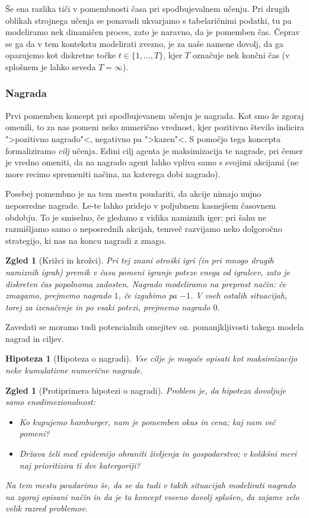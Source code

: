 \documentclass[12pt,a4paper]{amsart}
\theoremstyle{definition} %
\theoremstyle{plain} %
\newtheorem{zgled}[definicija]{Zgled}
\newtheorem{hipoteza}[definicija]{Hipoteza}
\begin{document}
Še ena razlika tiči v pomembnosti časa pri spodbujevalnem učenju. Pri drugih oblikah 
strojnega učenja se ponavadi ukvarjamo s tabelaričnimi podatki, tu pa modeliramo nek 
dinamičen proces, zato je naravno, da je pomemben čas. Čeprav se ga da v tem kontekstu 
modelirati zvezno, je za naše namene dovolj, da ga opazujemo kot diskretne točke $t \in 
\{1, \dots, T\} $, kjer $T$ označuje nek končni čas (v splošnem je lahko seveda $T = \infty$).

\subsubsection{Nagrada}
Prvi pomemben koncept pri spodbujevanem učenju je nagrada. Kot smo že zgoraj omenili, to za nas 
pomeni neko numerično vrednost, kjer pozitivno število indicira ">pozitivno nagrado"<, negativno pa 
">kazen"<. S pomočjo tega koncepta formaliziramo \textit{cilj} učenja. Edini cilj agenta je 
maksimizacija te nagrade, pri čemer je vredno omeniti, da na nagrado agent lahko vpliva samo 
s svojimi akcijami (ne more recimo spremeniti načina, na katerega dobi nagrado). 

Posebej pomembno je na tem mestu poudariti, da akcije nimajo nujno neposredne nagrade. Le-te 
lahko pridejo v poljubnem kasnejšem časovnem obdobju. To je smiselno, če gledamo z vidika 
namiznih iger: pri šahu ne razmišljamo samo o neposrednih akcijah, temveč razvijamo neko 
dolgoročno strategijo, ki nas na koncu nagradi z zmago. 

\begin{zgled}[Križci in krožci]
    Pri tej znani otroški igri (in pri mnogo drugih namiznih igrah) premik v času pomeni 
    igranje poteze enega od igralcev, zato je diskreten čas popolnoma zadosten. Nagrado 
    modeliramo na preprost način: če zmagamo, prejmemo nagrado $1$, če izgubimo pa $-1$. 
    V vseh ostalih situacijah, torej za izenačenje in po vsaki potezi, prejmemo nagrado $0$.
\end{zgled}

Zavedati se moramo tudi potencialnih omejitev oz. pomanjkljivosti takega modela nagrad in ciljev. 
\begin{hipoteza}[Hipoteza o nagradi]
    Vse cilje je mogoče opisati kot maksimizacijo neke kumulativne numerične 
    nagrade.
\end{hipoteza}

\begin{zgled}[Protiprimera hipotezi o nagradi]
    Problem je, da hipoteza dovoljuje samo enodimezionalnost:
    \begin{itemize}
        \item Ko kupujemo hamburger, nam je pomemben okus in cena; kaj nam več pomeni?
        \item Država želi med epidemijo ohraniti življenja in gospodarstvo; v kolikšni 
                meri naj prioritizira ti dve katergoriji?
    \end{itemize}
    Na tem mestu poudarimo še, da se da tudi v takih situacijah modelirati nagrado na zgoraj 
    opisani način in da je ta koncept vseeno dovolj splošen, da zajame zelo velik razred problemov.
    
\end{zgled}
\end{document}
